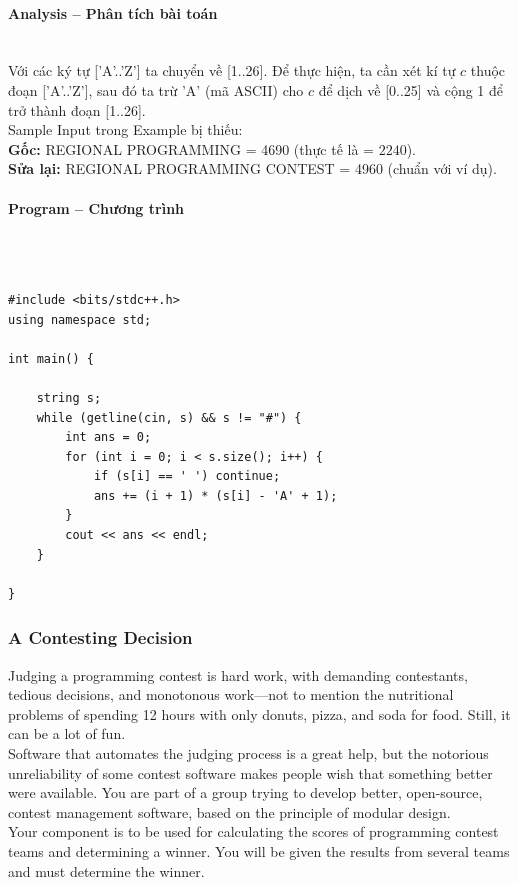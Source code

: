 \documentclass{article}
\begin{document}
\paragraph{Analysis -- Phân tích bài toán} \mbox{} \\

Với các ký tự ['A'..'Z'] ta chuyển về [1..26]. Để thực hiện, ta cần xét kí tự $c$ thuộc đoạn ['A'..'Z'], sau đó ta trừ 'A' (mã ASCII) cho $c$ để dịch về [0..25] và cộng 1 để trở thành đoạn [1..26]. \\

Sample Input trong Example bị thiếu:\\
\textbf{Gốc:} REGIONAL PROGRAMMING = 4690 (thực tế là = $2240$). \\
\textbf{Sửa lại:} REGIONAL PROGRAMMING CONTEST = 4960 (chuẩn với ví dụ).

\paragraph{Program -- Chương trình} \mbox{} \\


\begin{lstlisting}

#include <bits/stdc++.h>
using namespace std;
	
int main() {
	
	string s;
	while (getline(cin, s) && s != "#") {
		int ans = 0;
		for (int i = 0; i < s.size(); i++) {
			if (s[i] == ' ') continue;
			ans += (i + 1) * (s[i] - 'A' + 1);
		}
		cout << ans << endl;
	}

}

\end{lstlisting}


\subsubsection{A Contesting Decision}

Judging a programming contest is hard work, with demanding contestants, tedious decisions, and monotonous work—not to mention the nutritional problems of spending 12 hours with only donuts, pizza, and soda for food. Still, it can be a lot of fun.\\
Software that automates the judging process is a great help, but the notorious unreliability of some contest software makes people wish that something better were available. You are part of a group trying to develop better, open-source, contest management software, based on the principle of modular design. \\
Your component is to be used for calculating the scores of programming contest teams and determining a winner. You will be given the results from several teams and must determine the winner. \\
\end{document}
